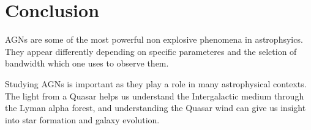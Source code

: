 \documentclass{article}
\begin{document}
\section*{Conclusion}
AGNs are some of the most powerful non explosive phenomena in astrophsyics. They appear differently depending on specific parameteres and the selction of bandwidth which one uses to observe them.

Studying AGNs is important as they play a role in many astrophysical contexts. The light from a Quasar helps us understand the Intergalactic medium through the Lyman alpha forest, and understanding the Quasar wind can give us insight into star formation and galaxy evolution.
\end{document}
